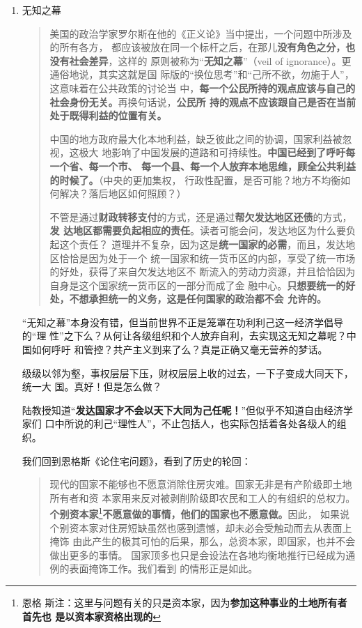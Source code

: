 \begin{enumerate}
\item 无知之幕
  \begin{quotation}
    美国的政治学家罗尔斯在他的《正义论》当中提出，一个问题中所涉及的所有各方，
    都应该被放在同一个标杆之后，在那儿\textbf{没有角色之分，也没有社会差异}，这样的
    原则被称为“\textbf{无知之幕}”（veil of ignorance）。更通俗地说，其实这就是国
    际版的“换位思考”和“己所不欲，勿施于人”，这意味着在公共政策的讨论当
    中，\textbf{每一个公民所持的观点应该与自己的社会身份无关。}再换句话说，\textbf{公民所
      持的观点不应该跟自己是否在当前处于既得利益的位置有关。}


    中国的地方政府最大化本地利益，缺乏彼此之间的协调，国家利益被忽视，这极大
    地影响了中国发展的道路和可持续性。\textbf{中国已经到了呼吁每一个省、每一个市、
      每一个县、每一个人放弃本地思维，顾全公共利益的时候了。}（中央的更加集权，
    行政性配置，是否可能？地方不均衡如何解决？落后地区如何照顾？）


    不管是通过\textbf{财政转移支付}的方式，还是通过\textbf{帮欠发达地区还债}的方式，\textbf{发
      达地区都需要负起相应的责任}。读者可能会问，发达地区为什么要负起这个责任？
    道理并不复杂，因为这是\textbf{统一国家的必需}，而且，发达地区恰恰是因为处于一个
    统一国家和统一货币区的内部，享受了统一市场的好处，获得了来自欠发达地区不
    断流入的劳动力资源，并且恰恰因为自身是这个国家统一货币区的一部分而成了金
    融中心。\textbf{只想要统一的好处，不想承担统一的义务，这是任何国家的政治都不会
      允许的。}
  \end{quotation}

  “无知之幕”本身没有错，但当前世界不正是笼罩在功利利己这一经济学倡导的“理
  性”之下么？从何让各级组织和个人放弃自利，去实现这无知之幕呢？中国如何呼吁
  和管控？共产主义到来了么？真是正确又毫无营养的梦话。

  级级以邻为壑，事权层层下压，财权层层上收的过去，一下子变成大同天下，统一大
  国。真好！但是怎么做？

  陆教授知道“\textbf{发达国家才不会以天下大同为己任呢！}”但似乎不知道自由经济学家们
  口中所说的利己“理性人”，不止包括人，也实际包括着各处各级人的组织。

  我们回到恩格斯《论住宅问题》，看到了历史的轮回：

  \begin{quotation}
    现代的国家不能够也不愿意消除住房灾难。国家无非是有产阶级即土地所有者和资
    本家用来反对被剥削阶级即农民和工人的有组织的总权力。\textbf{个别资本家}\footnote{恩格
      斯注：这里与问题有关的只是资本家，因为\textbf{参加这种事业的土地所有者首先也
        是以资本家资格出现的}}\textbf{不愿意做的事情，他们的国家也不愿意做。}因此，
    如果说个别资本家对住房短缺虽然也感到遗憾，却未必会受触动而去从表面上掩饰
    由此产生的极其可怕的后果，那么，总资本家，即国家，也并不会做出更多的事情。
    国家顶多也只是会设法在各地均衡地推行已经成为通例的表面掩饰工作。我们看到
    的情形正是如此。
  \end{quotation}


\end{enumerate}
